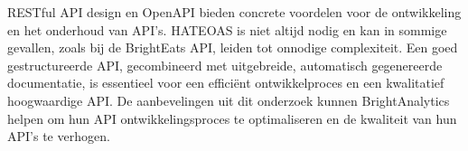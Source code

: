 \bigskip

RESTful API design en OpenAPI bieden concrete voordelen voor de ontwikkeling en het onderhoud van API's. HATEOAS is niet altijd nodig en kan in sommige gevallen, zoals bij de BrightEats API, leiden tot onnodige complexiteit. Een goed gestructureerde API, gecombineerd met uitgebreide, automatisch gegenereerde documentatie, is essentieel voor een efficiënt ontwikkelproces en een kwalitatief hoogwaardige API. De aanbevelingen uit dit onderzoek kunnen BrightAnalytics helpen om hun API ontwikkelingsproces te optimaliseren en de kwaliteit van hun API's te verhogen.

